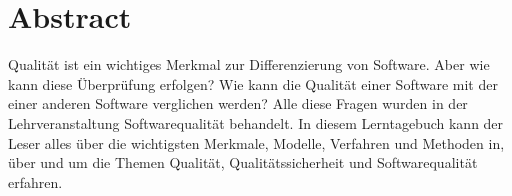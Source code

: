 \chapter{Abstract}
Qualität ist ein wichtiges Merkmal zur Differenzierung von Software. Aber wie kann diese Überprüfung erfolgen? Wie kann die Qualität einer Software mit der einer anderen Software verglichen werden? Alle diese Fragen wurden in der Lehrveranstaltung Softwarequalität behandelt. In diesem Lerntagebuch kann der Leser alles über die wichtigsten Merkmale, Modelle, Verfahren und Methoden in, über und um die Themen Qualität, Qualitätssicherheit und Softwarequalität erfahren.